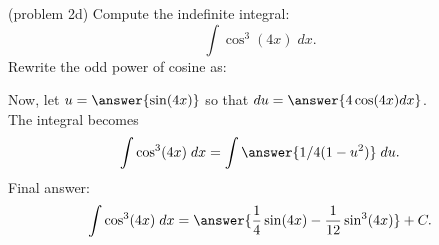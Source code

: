 \documentclass{ximera}
\begin{document}
\begin{problem}(problem 2d)
Compute the indefinite integral:
\[
\int \cos^3(4x) \; dx.
\]
Rewrite the odd power of cosine as:
\begin{multipleChoice}
\end{multipleChoice}

Now, let $u = \answer{\sin(4x)}$ so that $du = \answer{4\cos(4x) dx}$.\\
The integral becomes
\[
\int \cos^3(4x) \; dx= \int \answer{1/4 (1-u^2)} \; du.
\]
Final answer:
\[
\int \cos^3(4x) \; dx= \answer{\frac14 \sin(4x) - \frac{1}{12} \sin^3(4x) } + C.
\]
\end{problem}




\end{document}
